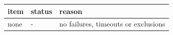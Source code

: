 \begin{tabular}{lll}
\hline
item & status & reason \\
\hline
none & - & no failures, timeouts or exclusions \\
\hline
\end{tabular}
